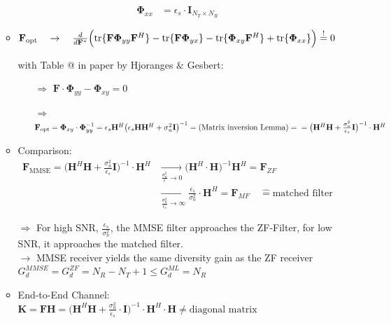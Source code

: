 \documentclass[a4paper, 10pt]{article}
\makeatletter
\newcommand{\Rmnum}[1]{\expandafter\@slowromancap\romannumeral #1@}
\makeatother
\begin{document}
\begin{itemize}
\begin{itemize}
\begin{align*}
			\boldsymbol{\Phi}_{xx} &= \epsilon_s\cdot\mathbf{I}_{N_T\times N_R}
		\end{align*}
		\item $\mathbf{F}_{\text{opt}} \quad \rightarrow \quad \frac{d}{d\mathbf{F}^*}\Bigl ( \text{tr}\{\mathbf{F}\boldsymbol{\Phi}_{yy}\mathbf{F}^H\} - \text{tr}\{\mathbf{F}\boldsymbol{\Phi}_{yx}\} - \text{tr}\{ \boldsymbol{\Phi}_{xy}\mathbf{F}^H\} + \text{tr}\{\boldsymbol{\Phi}_{xx}\}\Bigr )\overset{!}{=} 0 $
		\item[] with Table \Rmnum{4} in paper by Hjoranges $\&$ Gesbert:
		\begin{itemize}
			\item[$\Rightarrow$] $\mathbf{F}\cdot\boldsymbol{\Phi}_{yy} - \boldsymbol{\Phi}_{xy} = 0$  	
			\item[$\Rightarrow$] $ \mathbf{F}_{\text{opt}} = \boldsymbol{\Phi}_{xy}\cdot\boldsymbol{\Phi}_{yy}^{-1} = \epsilon_s\mathbf{H}^H\bigl(\epsilon_s\mathbf{H}\mathbf{H}^H + \sigma_n^2\mathbf{I}\bigr)^{-1} \medskip\\ = \text{(Matrix inversion Lemma)} =\medskip \\ = \bigl( \mathbf{H}^H\mathbf{H} + \frac{\sigma_n^2}{\epsilon_s}\mathbf{I}\bigr)^{-1}\cdot\mathbf{H}^H$
		\end{itemize}
		\item Comparison:
		\begin{align*}
			 \mathbf{F}_{\text{MMSE}} = \bigl( \mathbf{H}^H\mathbf{H} + \frac{\sigma_n^2}{\epsilon_s}\mathbf{I} \bigr)^{-1}\cdot\mathbf{H}^H &\xrightarrow[{\frac{\sigma_n^2}{\epsilon} \to 0}]{}\bigl(\mathbf{H}^H\cdot\mathbf{H}\bigr)^{-1}\mathbf{H}^H = \mathbf{F}_{ZF}\\ &\xrightarrow[\frac{\sigma_n^2}{\epsilon_s} \to\infty]{} \frac{\epsilon_s}{\sigma_n^2} \cdot\mathbf{H}^H = \mathbf{F}_{MF} \quad \widehat{=} \text{matched filter}
		\end{align*}
		\item[$\Rightarrow$] For high SNR, $\frac{\epsilon_s}{\sigma_n^2}$, the MMSE filter approaches the ZF-Filter, for low SNR, it approaches the matched filter. \medskip\\ $\rightarrow$ MMSE receiver yields the same diversity gain as the ZF receiver \medskip\\ $G_d^{MMSE} = G_d^{ZF} = N_R - N_T + 1\leq G_d^{ML} = N_R$
		\item End-to-End Channel: $\mathbf{K} = \mathbf{FH} = \bigl(\mathbf{H}^H\mathbf{H} + \frac{\sigma_n^2}{\epsilon_s}\cdot\mathbf{I}\bigr)^{-1}\cdot\mathbf{H}^H\cdot\mathbf{H} \neq \text{diagonal matrix}$

\end{itemize}
\end{itemize}
\end{document}
